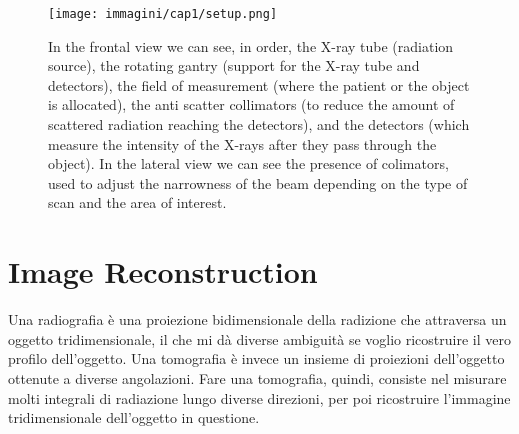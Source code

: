 \begin{figure}[!ht]
    \centering
    \texttt{[image: immagini/cap1/setup.png]} 
    \caption{In the frontal view we can see, in order, the X-ray tube (radiation source), the rotating gantry (support for the X-ray tube and detectors), the field of measurement (where the patient or the object is allocated), the anti scatter collimators (to reduce the amount of scattered radiation reaching the detectors), and the detectors (which measure the intensity of the X-rays after they pass through the object). In the lateral view we can see the presence of colimators, used to adjust the narrowness of the beam depending on the type of scan and the area of interest.} 
    \label{fig:CT_detector}
\end{figure}

\section{Image Reconstruction}
Una radiografia è una proiezione bidimensionale della radizione che attraversa un oggetto tridimensionale, il che mi dà diverse ambiguità se voglio ricostruire il vero profilo dell'oggetto.
Una tomografia è invece un insieme di proiezioni dell'oggetto ottenute a diverse angolazioni.
Fare una tomografia, quindi, consiste nel misurare molti integrali di radiazione lungo diverse direzioni, per poi ricostruire l'immagine tridimensionale dell'oggetto in questione.

